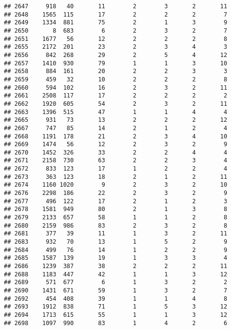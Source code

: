 \documentclass[]{article}
\begin{document}
\begin{verbatim}
## 2647     918   40       11        2        3       2       11
## 2648    1565  115       17        2        2       2        7
## 2649    1334  881       75        2        1       3        9
## 2650       8  683        6        2        3       2        7
## 2651    1677   56       12        2        2       2        8
## 2655    2172  201       23        2        3       4        3
## 2656     842  268       29        2        5       4       12
## 2657    1410  930       79        1        1       3       10
## 2658     884  161       20        2        2       3        3
## 2659     459   32       10        2        2       2        8
## 2660     594  102       16        2        3       2       11
## 2661    2508  117       17        2        2       2        2
## 2662    1920  605       54        2        3       2       11
## 2663    1396  515       47        1        1       4        4
## 2665     931   73       13        2        2       2       12
## 2667     747   85       14        2        1       2        4
## 2668    1191  178       21        2        3       4       10
## 2669    1474   56       12        2        3       2        9
## 2670    1452  326       33        2        2       4        4
## 2671    2158  730       63        2        2       3        4
## 2672     833  123       17        1        2       2        4
## 2673     363  123       18        2        1       2       11
## 2674    1160 1020        9        2        3       2       10
## 2676    2298  186       22        2        3       2        9
## 2677     496  122       17        2        1       2        3
## 2678    1581  949       80        2        1       3        8
## 2679    2133  657       58        1        1       2        8
## 2680    2159  986       83        2        3       2        8
## 2681     377   39       11        1        3       2       11
## 2683     932   70       13        1        5       2        9
## 2684     499   76       14        1        2       2        9
## 2685    1587  139       19        1        3       3        4
## 2686    1239  387       38        2        2       2       11
## 2688    1183  447       42        1        1       3       12
## 2689     571  677        6        1        3       2        2
## 2690    1431  671       59        1        3       2        7
## 2692     454  408       39        1        1       4        8
## 2693    1912  838       71        1        5       3       12
## 2694    1713  615       55        1        1       3       12
## 2698    1097  990       83        1        4       2        6

\end{verbatim}
\end{document}
